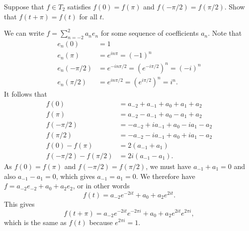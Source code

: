 \begin{exercise}
 Suppose that $f\in T_2$ satisfies $f(0)=f(\pi)$ and
 $f(-\pi/2)=f(\pi/2)$.  Show that $f(t+\pi)=f(t)$ for all $t$.
\end{exercise}
\begin{solution}
 We can write $f=\sum_{n=-2}^2a_ne_n$ for some sequence of
 coefficients $a_n$.  Note that 
 \begin{align*}
  e_n(0) &= 1 \\
  e_n(\pi) &= e^{in\pi} = (-1)^n \\
  e_n(-\pi/2) &= e^{-in\pi/2} = (e^{-i\pi/2})^n = (-i)^n \\
  e_n(\pi/2) &= e^{in\pi/2} = (e^{i\pi/2})^n = i^n.
 \end{align*}
 It follows that 
 \begin{align*}
  f(0)      &= a_{-2} + a_{-1} + a_0 + a_1 + a_2 \\
  f(\pi)    &= a_{-2} - a_{-1} + a_0 - a_1 + a_2 \\
  f(-\pi/2) &= -a_{-2} + ia_{-1} + a_0 - ia_1 - a_2 \\
  f(\pi/2)  &= -a_{-2} - ia_{-1} + a_0 + ia_1 - a_2 \\
  f(0)-f(\pi) &= 2(a_{-1}+a_1) \\
  f(-\pi/2)-f(\pi/2) &= 2i(a_{-1}-a_1). 
 \end{align*}
 As $f(0)=f(\pi)$ and $f(-\pi/2)=f(\pi/2)$, we must have
 $a_{-1}+a_1=0$ and also $a_{-1}-a_1=0$, which gives $a_{-1}=a_1=0$.
 We therefore have $f=a_{-2}e_{-2}+a_0+a_2e_2$, or in other words
 \[ f(t) = a_{-2} e^{-2it} + a_0 + a_2 e^{2it}. \]
 This gives 
 \[ f(t+\pi) = 
  a_{-2} e^{-2it}e^{-2\pi i} + a_0 + a_2 e^{2it} e^{2\pi i},
 \]
 which is the same as $f(t)$ because $e^{2\pi i}=1$.
\end{solution}

